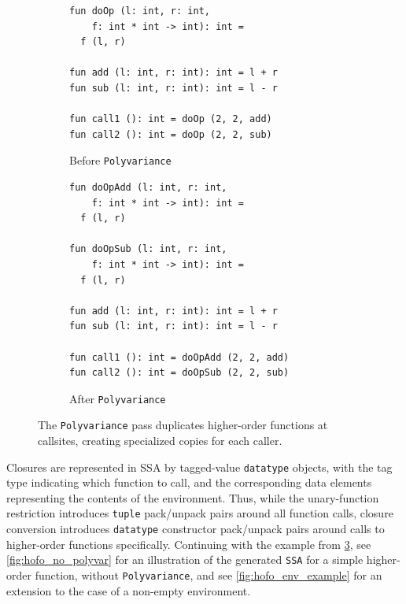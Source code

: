 \begin{figure}[!htb]
  \centering
  \begin{subfigure}[t]{0.48\textwidth}
    \caption{Before \texttt{Polyvariance}}
    \label{fig:polyvar_sml_before}
    \vspace{1mm}
\begin{verbatim}
fun doOp (l: int, r: int,
    f: int * int -> int): int =
  f (l, r)

fun add (l: int, r: int): int = l + r
fun sub (l: int, r: int): int = l - r

fun call1 (): int = doOp (2, 2, add)
fun call2 (): int = doOp (2, 2, sub)
\end{verbatim}
  \end{subfigure}\hfill
  \begin{subfigure}[t]{0.48\textwidth}
    \caption{After \texttt{Polyvariance}}
    \label{fig:polyvar_sml_after}
    \vspace{1mm}
\begin{verbatim}
fun doOpAdd (l: int, r: int,
    f: int * int -> int): int =
  f (l, r)

fun doOpSub (l: int, r: int,
    f: int * int -> int): int =
  f (l, r)

fun add (l: int, r: int): int = l + r
fun sub (l: int, r: int): int = l - r

fun call1 (): int = doOpAdd (2, 2, add)
fun call2 (): int = doOpSub (2, 2, sub)
\end{verbatim}
  \end{subfigure}
  \caption{The \texttt{Polyvariance} pass duplicates higher-order functions at callsites, creating specialized copies for each caller.}
  \label{fig:polyvar_sml_example}
\end{figure}


Closures are represented in SSA by tagged-value \texttt{datatype} objects, with
the tag type indicating which function to call, and the corresponding data
elements representing the contents of the environment. Thus, while the
unary-function restriction introduces \texttt{tuple} pack/unpack pairs around
all function calls, closure conversion introduces \texttt{datatype} constructor
pack/unpack pairs around calls to higher-order functions specifically.
Continuing with the example from \cref{fig:polyvar_sml_example}, see
\cref{fig:hofo_no_polyvar} for an illustration of the generated \texttt{SSA} for
a simple higher-order function, without \texttt{Polyvariance}, and see
\cref{fig:hofo_env_example} for an extension to the case of a non-empty
environment.

